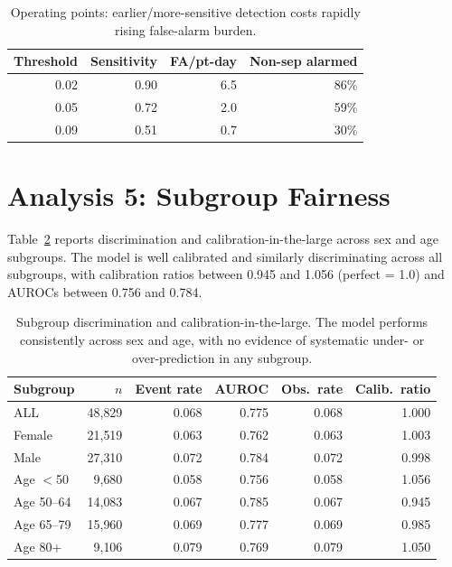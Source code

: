 \begin{table}[H]
    \centering
    \begin{tabular}{r|r|r|r}
        \hline
        \textbf{Threshold} & \textbf{Sensitivity} & \textbf{FA/pt-day} & \textbf{Non-sep alarmed} \\
        \hline\hline
        0.02 & 0.90 & 6.5 & 86\% \\
        0.05 & 0.72 & 2.0 & 59\% \\
        0.09 & 0.51 & 0.7 & 30\% \\
        \hline
    \end{tabular}
    \caption{Operating points: earlier/more-sensitive detection costs rapidly
    rising false-alarm burden.}
    \label{table:alarm_ops}
\end{table}

\section{Analysis 5: Subgroup Fairness}

Table~\ref{table:subgroups} reports discrimination and
calibration-in-the-large across sex and age subgroups. The model is well
calibrated and similarly discriminating across all subgroups, with calibration
ratios between 0.945 and 1.056 (perfect = 1.0) and AUROCs between 0.756 and
0.784.

\begin{table}[H]
    \centering
    \begin{tabular}{l|r|r|r|r|r}
        \hline
        \textbf{Subgroup} & \textbf{$n$} & \textbf{Event rate} & \textbf{AUROC} & \textbf{Obs.\ rate} & \textbf{Calib.\ ratio} \\
        \hline\hline
        ALL      & 48{,}829 & 0.068 & 0.775 & 0.068 & 1.000 \\
        Female   & 21{,}519 & 0.063 & 0.762 & 0.063 & 1.003 \\
        Male     & 27{,}310 & 0.072 & 0.784 & 0.072 & 0.998 \\
        Age $<$50 & 9{,}680  & 0.058 & 0.756 & 0.058 & 1.056 \\
        Age 50--64 & 14{,}083 & 0.067 & 0.785 & 0.067 & 0.945 \\
        Age 65--79 & 15{,}960 & 0.069 & 0.777 & 0.069 & 0.985 \\
        Age 80+  & 9{,}106  & 0.079 & 0.769 & 0.079 & 1.050 \\
        \hline
    \end{tabular}
    \caption{Subgroup discrimination and calibration-in-the-large. The model
    performs consistently across sex and age, with no evidence of systematic
    under- or over-prediction in any subgroup.}
    \label{table:subgroups}
\end{table}

